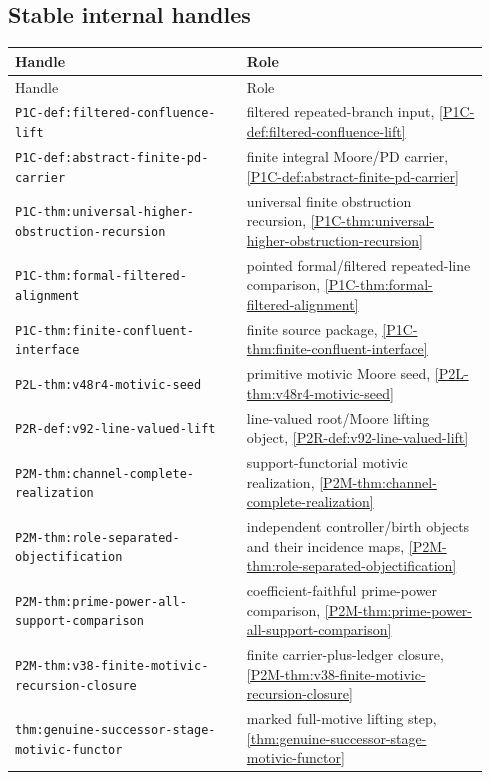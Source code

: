 \documentclass[11pt]{article}
\theoremstyle{remark}
\begin{document}
\subsection*{Stable internal handles}
\begin{longtable}{@{}p{0.46\linewidth}p{0.48\linewidth}@{}}
\toprule
\normalfont Handle & Role\\
\midrule
\endfirsthead
\toprule
\normalfont Handle & Role\\
\midrule
\endhead
\nolinkurl{P1C-def:filtered-confluence-lift}
  & filtered repeated-branch input, \cref{P1C-def:filtered-confluence-lift}\\
\nolinkurl{P1C-def:abstract-finite-pd-carrier}
  & finite integral Moore/PD carrier, \cref{P1C-def:abstract-finite-pd-carrier}\\
\nolinkurl{P1C-thm:universal-higher-obstruction-recursion}
  & universal finite obstruction recursion, \cref{P1C-thm:universal-higher-obstruction-recursion}\\
\nolinkurl{P1C-thm:formal-filtered-alignment}
  & pointed formal/filtered repeated-line comparison, \cref{P1C-thm:formal-filtered-alignment}\\
\nolinkurl{P1C-thm:finite-confluent-interface}
  & finite source package, \cref{P1C-thm:finite-confluent-interface}\\
\nolinkurl{P2L-thm:v48r4-motivic-seed}
  & primitive motivic Moore seed, \cref{P2L-thm:v48r4-motivic-seed}\\
\nolinkurl{P2R-def:v92-line-valued-lift}
  & line-valued root/Moore lifting object, \cref{P2R-def:v92-line-valued-lift}\\
\nolinkurl{P2M-thm:channel-complete-realization}
  & support-functorial motivic realization, \cref{P2M-thm:channel-complete-realization}\\
\nolinkurl{P2M-thm:role-separated-objectification}
  & independent controller/birth objects and their incidence maps,
    \cref{P2M-thm:role-separated-objectification}\\
\nolinkurl{P2M-thm:prime-power-all-support-comparison}
  & coefficient-faithful prime-power comparison, \cref{P2M-thm:prime-power-all-support-comparison}\\
\nolinkurl{P2M-thm:v38-finite-motivic-recursion-closure}
  & finite carrier-plus-ledger closure, \cref{P2M-thm:v38-finite-motivic-recursion-closure}\\
\nolinkurl{thm:genuine-successor-stage-motivic-functor}
  & marked full-motive lifting step, \cref{thm:genuine-successor-stage-motivic-functor}\\

\end{longtable}
\end{document}
